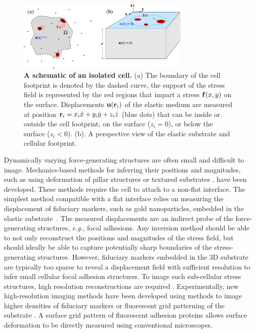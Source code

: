 \documentclass[aps,prl,reprint,groupedaddress,twocolumn]{revtex4-1}
\def\r{{\bf r}}
\begin{document}
\begin{figure}[t]
\begin{center}
\includegraphics[width=3.3in]{Fig1.pdf}
\caption{\textbf{A schematic of an isolated cell.} (a) The boundary of the cell
  footprint is denoted by the dashed curve, the support of the stress
  field is represented by the red regions that impart a stress ${\bf
    f}(x,y)$ on the surface. Displacements ${\bf u}(\r_{i})$ of the
  elastic medium are measured at position $\r_{i} =
  x_{i}\hat{x}+y_{i}\hat{y}+z_{i}\hat{z}$ (blue dots) that can be
  inside or outside the cell footprint, on the surface ($z_{i}=0$), or
  below the surface ($z_{i}<0$). (b). A perspective view of the
  elastic substrate and cellular footprint.}
\label{FIG1}
\end{center}
\end{figure}

Dynamically varying force-generating structures are often small and
difficult to image. Mechanics-based methods for inferring their
positions and magnitudes, such as using deformation of pillar
structures \cite{PILLAR} or textured substrates \cite{PATTERN}, have
been developed.  These methods require the cell to attach to a
non-flat interface.  The simplest method compatible with a flat
interface relies on measuring the displacement of fiduciary markers,
such as gold nanoparticles, embedded in the elastic
substrate~\cite{WANG2007}. The measured displacements are an indirect
probe of the force-generating structures, \textit{e.g.}, focal
adhesions.  Any inversion method should be able to not only
reconstruct the positions and magnitudes of the stress field, but
should ideally be able to capture potentially sharp boundaries of the
stress-generating structures. However, fiduciary markers embedded in
the 3D substrate are typically too sparse to reveal a displacement
field with sufficient resolution to infer small cellular focal
adhesion structures. To image such sub-cellular stress structures,
high resolution reconstructions are required \cite{USCHWARZ,YORK}.
Experimentally, new high-resolution imaging methods have been
developed using methods to image higher densities of fiduciary markers
\cite{YORK} or fluorescent grid patterning of the substrate
\cite{POPESCU}. A surface grid pattern of fluorescent adhesion
proteins allows surface deformation to be directly measured using
conventional microscopes.
\end{document}
